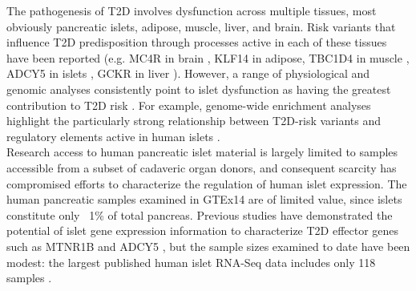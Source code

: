 The pathogenesis of T2D involves dysfunction across multiple tissues, most obviously pancreatic islets, adipose, muscle, liver, and brain. Risk variants that influence T2D predisposition through processes active in each of these tissues have been reported (e.g. MC4R in brain \cite{vaisseMelanocortin4ReceptorMutations2000}, KLF14 in adipose, TBC1D4 in muscle \cite{moltkeCommonGreenlandicTBC1D42014}, ADCY5 in islets \cite{thurnerIntegrationHumanPancreatic2018}, GCKR in liver \cite{saxenaGenomeWideAssociationAnalysis2007}). However, a range of physiological and genomic analyses consistently point to islet dysfunction as having the greatest contribution to T2D risk \cite{mahajanFinemappingTypeDiabetes2018, dimasImpactTypeDiabetes2014, woodGenomeWideAssociationStudy2017}. For example, genome-wide enrichment analyses highlight the particularly strong relationship between T2D-risk variants and regulatory elements active in human islets \cite{parkerChromatinStretchEnhancer2013, pasqualiPancreaticIsletEnhancer2014, varshneyGeneticRegulatorySignatures2017, thurnerIntegrationHumanPancreatic2018}. \\
    
Research access to human pancreatic islet material is largely limited to samples accessible from a subset of cadaveric organ donors, and consequent scarcity has compromised efforts to characterize the regulation of human islet expression. The human pancreatic samples examined in GTEx14 are of limited value, since islets constitute only ~1\% of total pancreas. Previous studies have demonstrated the potential of islet gene expression information to characterize T2D effector genes such as MTNR1B and ADCY5 \cite{varshneyGeneticRegulatorySignatures2017, fadistaGlobalGenomicTranscriptomic2014, vandebuntTranscriptExpressionData2015}, but the sample sizes examined to date have been modest: the largest published human islet RNA-Seq data includes only 118 samples \cite{vandebuntTranscriptExpressionData2015}. \\
    
